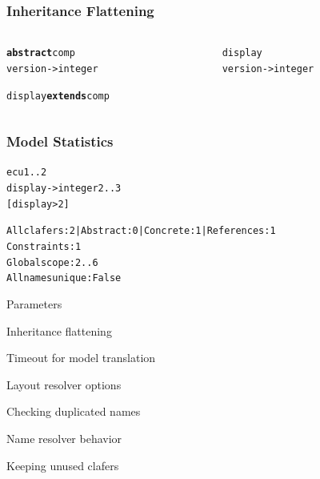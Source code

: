 \documentclass[table,15pt,t]{beamer}
\newcommand{\vmiddle}[1]{
  \vspace{\stretch{1}}
  #1
  \vspace{\stretch{1}}
}
\newcommand{\mlist}[1]{
\vmiddle{
  \begin{list}{}{}
    #1
  \end{list}
  }
}
\newcounter{i}
\begin{document}
\begin{frame}[fragile]
  \frametitle{Inheritance Flattening}
  \begin{columns}
    \begin{column}{0.5\textwidth}
      \begin{alltt}
        \begin{small}
\textbf{abstract} \textsf{comp}
  \textsf{version} -> \textsf{integer}

\textsf{display} \textbf{extends} \textsf{comp}
        \end{small}
      \end{alltt}
    \end{column}
\pause
    \begin{column}{0.5\textwidth}
      \begin{alltt}
        \begin{small}
\textsf{display}
  \textsf{version} -> \textsf{integer}
        \end{small}
      \end{alltt}
    \end{column}
  \end{columns}
\end{frame}

\begin{frame}[fragile]
  \frametitle{Model Statistics}
      \begin{alltt}
        \begin{small}
\textsf{ecu} 1..2
  \textsf{display} -> \textsf{integer} 2..3
  \textsf{[display > 2]}
        \end{small}
      \end{alltt}
\pause
      \begin{alltt}
        \begin{small}
All clafers: 2 | Abstract: 0 | Concrete: 1 | References: 1
Constraints: 1
Global scope: 2..6
All names unique: False
        \end{small}
      \end{alltt}
\end{frame}

\begin{frame}{Parameters}
 \mlist{
    \item Inheritance flattening
    \item Timeout for model translation
    \item Layout resolver options
    \item Checking duplicated names
    \item Name resolver behavior
    \item Keeping unused clafers
 }
\end{frame}
\end{document}
